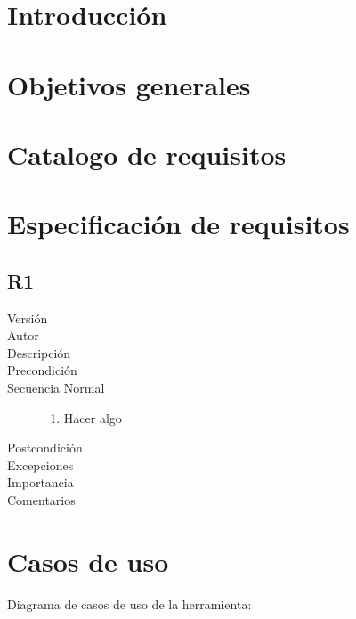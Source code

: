 
\section{Introducción}

\section{Objetivos generales}

\section{Catalogo de requisitos}

\section{Especificación de requisitos}

\subsection{R1}
\begin{description}
	\item [Versión]
	\item [Autor]
	\item [Descripción]
	\item [Precondición]
	\item [Secuencia Normal]
		\begin{enumerate}
			\item Hacer algo
		\end{enumerate}
	\item [Postcondición]
	\item [Excepciones]
	\item [Importancia]
	\item [Comentarios]
\end{description}

\section{Casos de uso}
Diagrama de casos de uso de la herramienta:


